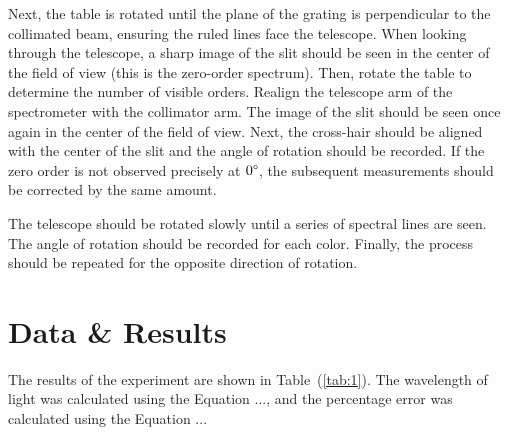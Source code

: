 \documentclass[10pt]{article}
\newcommand{\td}[1]{\todo[linecolor=blue, backgroundcolor=blue!25,bordercolor=blue, size=\small, inline]{#1}}
\begin{document}
Next, the table is rotated until the plane of the grating is perpendicular to the collimated beam, ensuring the ruled lines face the telescope. When looking through the telescope, a sharp image of the slit should be seen in the center of the field of view (this is the zero-order spectrum). Then, rotate the table to determine the number of visible orders. Realign the telescope arm of the spectrometer with the collimator arm. The image of the slit should be seen once again in the center of the field of view. Next, the cross-hair should be aligned with the center of the slit and the angle of rotation should be recorded. If the zero order is not observed precisely at $0\degree$, the subsequent measurements should be corrected by the same amount.

The telescope should be rotated slowly until a series of spectral lines are seen. The angle of rotation should be recorded for each color. Finally, the process should be repeated for the opposite direction of rotation.

\section{Data \& Results}

\td{!!!}

The results of the experiment are shown in Table~(\ref{tab:1}). The wavelength of light was calculated using the Equation ..., and the percentage error was calculated using the Equation ... 
\end{document}
